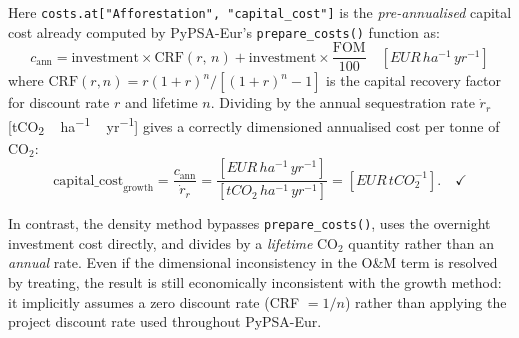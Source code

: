 \documentclass[12pt, a4paper]{article}
\begin{document}
\noindent Here \texttt{costs.at["Afforestation",\,"capital\_cost"]} is the
\emph{pre-annualised} capital cost already computed by PyPSA-Eur's
\texttt{prepare\_costs()} function as:
\[
  c_{\text{ann}} = \text{investment} \times \mathrm{CRF}(r,\,n)
                 + \text{investment} \times \frac{\text{FOM}}{100}
  \quad [\si{EUR\,ha^{-1}\,yr^{-1}}]
\]
where $\mathrm{CRF}(r,n) = r(1+r)^n/[(1+r)^n - 1]$ is the capital recovery
factor for discount rate $r$ and lifetime $n$. Dividing by the annual
sequestration rate $\dot{r}_r$ [\si{tCO_2\,ha^{-1}\,yr^{-1}}] gives a
correctly dimensioned annualised cost per tonne of CO$_2$:
\[
  \text{capital\_cost}_{\text{growth}}
  = \frac{c_{\text{ann}}}{\dot{r}_r}
  = \frac{[\si{EUR\,ha^{-1}\,yr^{-1}}]}{[\si{tCO_2\,ha^{-1}\,yr^{-1}}]}
  = [\si{EUR\,tCO_2^{-1}}]. \quad \checkmark
\]

\noindent In contrast, the density method bypasses \texttt{prepare\_costs()},
uses the overnight investment cost directly, and divides by a \emph{lifetime}
CO$_2$ quantity rather than an \emph{annual} rate.  Even if the dimensional
inconsistency in the O\&M term is resolved by treating, the result is still economically inconsistent with the growth
method: it implicitly assumes a zero discount rate (CRF $= 1/n$) rather than
applying the project discount rate used throughout PyPSA-Eur.

\newpage


\end{document}
